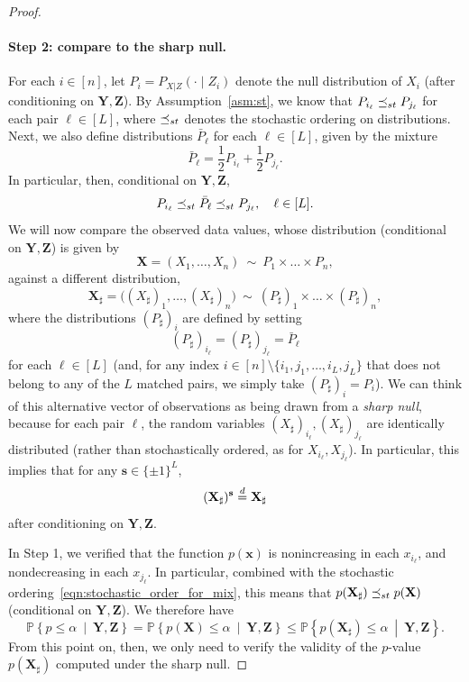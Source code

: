 \documentclass[12pt]{article}
\newcommand{\PPst}[2]{\mathbb{P}\left\{{#1}\  \middle| \ {#2}\right\}}
\newcommand{\eqd}{\stackrel{\textnormal{d}}{=}}
\newcommand{\bs}{\mathbf{s}}
\newcommand{\bx}{\mathbf{x}}
\newcommand{\bX}{\mathbf{X}}
\newcommand{\bY}{\mathbf{Y}}
\newcommand{\bZ}{\mathbf{Z}}
\begin{document}
\begin{proof}
\paragraph{Step 2: compare to the sharp null.} For each $i\in[n]$, let $P_i = P_{X|Z}(\cdot\mid Z_i)$ denote the null distribution of $X_i$ (after conditioning on $\bY,\bZ$). 
By Assumption~\ref{asm:st}, we know that $P_{i_\ell}\preceq_{\rm st}P_{j_\ell}$ for each pair $\ell\in[L]$, where $\preceq_{\rm st}$ denotes the stochastic ordering on distributions. Next, we also define distributions $\bar{P}_\ell$ for each $\ell\in[L]$, given by the mixture
\[\bar{P}_\ell = \frac{1}{2}P_{i_\ell}+ \frac{1}{2}P_{j_\ell}.\] In particular, then, conditional on $\bY, \bZ$,
\begin{equation}\label{eqn:stochastic_order_for_mix}P_{i_\ell}\preceq_{\rm st}\bar{P}_\ell\preceq_{\rm st}P_{j_\ell}, \quad \ell\in[L].\end{equation}
We will now compare the observed data values, whose distribution (conditional on $\bY,\bZ$) is given by
\[\bX = (X_1,\dots,X_n)\ \sim \  P_1\times \dots \times P_n,\]
against a different distribution,
\[\bX_{\sharp} = \bigl((X_\sharp)_1,\dots,(X_\sharp)_n\bigr) \ \sim \  (P_\sharp)_1 \times \dots\times (P_\sharp)_n,\]
where the distributions $(P_\sharp)_i$ are defined by setting
\[(P_\sharp)_{i_\ell} = (P_\sharp)_{j_\ell} = \bar{P}_\ell\]
for each $\ell\in[L]$ (and, for any index $i\in[n]\setminus \{i_1,j_1,\dots,i_L,j_L\}$ that does not belong to any of the $L$ matched pairs, we simply take $(P_\sharp)_i=P_i$).
We can think of this alternative vector of observations as being drawn from a \emph{sharp null}, because for each pair $\ell$, the random variables $(X_\sharp)_{i_\ell},(X_\sharp)_{j_\ell}$ are identically distributed (rather than stochastically ordered, as for $X_{i_\ell},X_{j_\ell}$). In particular, this implies that for any $\bs\in\{\pm 1\}^L$,
\begin{equation}\label{eqn:eqd_under_sharp_null}(\bX_\sharp)^\bs \eqd \bX_\sharp\end{equation}
after conditioning on $\bY,\bZ$. 

In Step 1, we verified that the function $p(\bx)$ is nonincreasing in each $x_{i_\ell}$, and nondecreasing in each $x_{j_\ell}$. In particular, combined with the stochastic ordering~\eqref{eqn:stochastic_order_for_mix}, this means that
$p(\bX_\sharp)\preceq_{\rm st} p(\bX) $
 (conditional on $\bY,\bZ$). We therefore have
\[\PPst{p\leq \alpha}{\bY,\bZ} = \PPst{p(\bX)\leq \alpha}{\bY,\bZ}\leq \PPst{p(\bX_\sharp)\leq \alpha}{ \bY,\bZ}.\]
From this point on, then, we only need to verify the validity of the $p$-value $p(\bX_\sharp)$ computed under the sharp null.



\end{proof}
\end{document}

